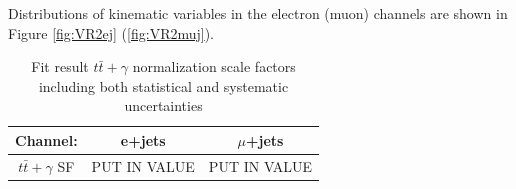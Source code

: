 Distributions of kinematic variables in the electron (muon) channels are shown in Figure \ref{fig:VR2ej} (\ref{fig:VR2muj}).
\begin{table}[h]
\begin{center}
{\renewcommand{\arraystretch}{1.2}
\begin{tabular}{c|c|c}
\hline
Channel:     &  e+jets   & $\mu$+jets  \\  \hline 
$t\bar{t}+\gamma$ SF    &  PUT IN VALUE   & PUT IN VALUE	\\ \hline %
\end{tabular}
\caption{Fit result $t\bar{t}+\gamma$ normalization scale factors including both statistical and systematic uncertainties}
\label{tab:VR2SFs}
}
\end{center}
\end{table}

